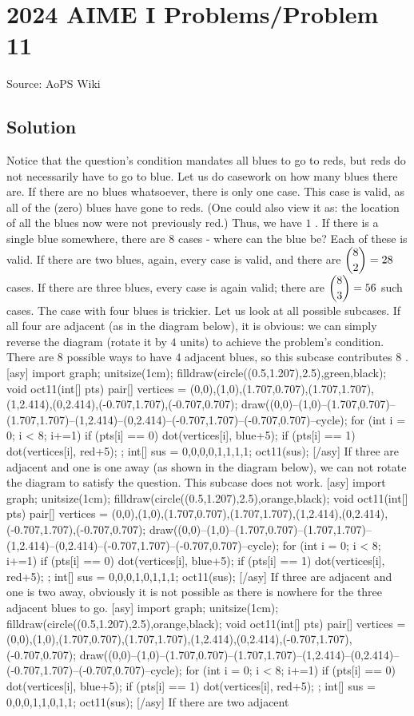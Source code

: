 \documentclass[12pt]{article}
\begin{document}
\section*{{2024 AIME I Problems/Problem 11}}
Source: AoPS Wiki

\subsection*{Solution}
Notice that the question's condition mandates all blues to go to reds, but reds do not necessarily have to go to blue. Let us do casework on how many blues there are. If there are no blues whatsoever, there is only one case. This case is valid, as all of the (zero) blues have gone to reds. (One could also view it as: the location of all the blues now were not previously red.) Thus, we have $1$ . If there is a single blue somewhere, there are $8$ cases - where can the blue be? Each of these is valid. If there are two blues, again, every case is valid, and there are $\dbinom82=28$ cases. If there are three blues, every case is again valid; there are $\dbinom83=56$ such cases. The case with four blues is trickier. Let us look at all possible subcases. If all four are adjacent (as in the diagram below), it is obvious: we can simply reverse the diagram (rotate it by $4$ units) to achieve the problem's condition. There are $8$ possible ways to have $4$ adjacent blues, so this subcase contributes $8$ . [asy] import graph; unitsize(1cm); filldraw(circle((0.5,1.207),2.5),green,black); void oct11(int[] pts) { pair[] vertices = {(0,0),(1,0),(1.707,0.707),(1.707,1.707),(1,2.414),(0,2.414),(-0.707,1.707),(-0.707,0.707)}; draw((0,0)--(1,0)--(1.707,0.707)--(1.707,1.707)--(1,2.414)--(0,2.414)--(-0.707,1.707)--(-0.707,0.707)--cycle); for (int i = 0; i < 8; i+=1) { if (pts[i] == 0) { dot(vertices[i], blue+5); } if (pts[i] == 1) { dot(vertices[i], red+5); } } }; int[] sus = {0,0,0,0,1,1,1,1}; oct11(sus); [/asy] If three are adjacent and one is one away (as shown in the diagram below), we can not rotate the diagram to satisfy the question. This subcase does not work. [asy] import graph; unitsize(1cm); filldraw(circle((0.5,1.207),2.5),orange,black); void oct11(int[] pts) { pair[] vertices = {(0,0),(1,0),(1.707,0.707),(1.707,1.707),(1,2.414),(0,2.414),(-0.707,1.707),(-0.707,0.707)}; draw((0,0)--(1,0)--(1.707,0.707)--(1.707,1.707)--(1,2.414)--(0,2.414)--(-0.707,1.707)--(-0.707,0.707)--cycle); for (int i = 0; i < 8; i+=1) { if (pts[i] == 0) { dot(vertices[i], blue+5); } if (pts[i] == 1) { dot(vertices[i], red+5); } } }; int[] sus = {0,0,0,1,0,1,1,1}; oct11(sus); [/asy] If three are adjacent and one is two away, obviously it is not possible as there is nowhere for the three adjacent blues to go. [asy] import graph; unitsize(1cm); filldraw(circle((0.5,1.207),2.5),orange,black); void oct11(int[] pts) { pair[] vertices = {(0,0),(1,0),(1.707,0.707),(1.707,1.707),(1,2.414),(0,2.414),(-0.707,1.707),(-0.707,0.707)}; draw((0,0)--(1,0)--(1.707,0.707)--(1.707,1.707)--(1,2.414)--(0,2.414)--(-0.707,1.707)--(-0.707,0.707)--cycle); for (int i = 0; i < 8; i+=1) { if (pts[i] == 0) { dot(vertices[i], blue+5); } if (pts[i] == 1) { dot(vertices[i], red+5); } } }; int[] sus = {0,0,0,1,1,0,1,1}; oct11(sus); [/asy] If there are two adjacent 
\end{document}
